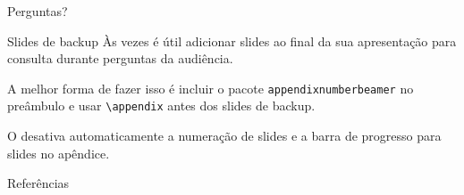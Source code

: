 \begin{frame}[standout]
  Perguntas?
\end{frame}

\appendix

\begin{frame}[fragile]{Slides de backup}
  Às vezes é útil adicionar slides ao final da sua apresentação para
  consulta durante perguntas da audiência.

  A melhor forma de fazer isso é incluir o pacote \verb|appendixnumberbeamer|
  no preâmbulo e usar \verb|\appendix| antes dos slides de backup.

  O \themename desativa automaticamente a numeração de slides e a barra de progresso
  para slides no apêndice.
\end{frame}

\begin{frame}[allowframebreaks]{Referências}

  
  

\end{frame}